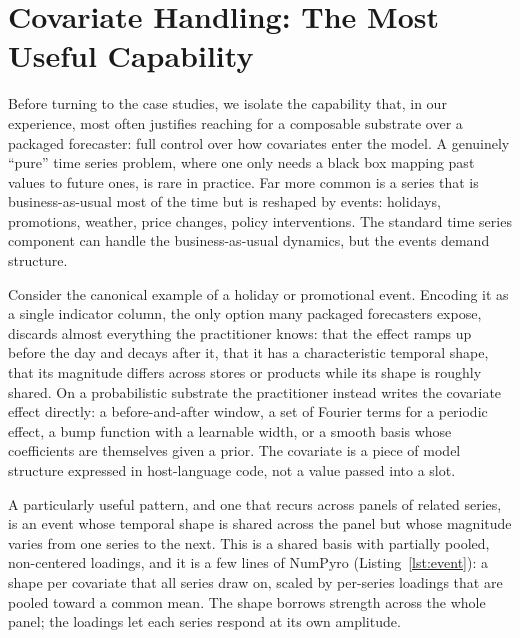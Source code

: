 \documentclass[11pt,3p,review,authoryear]{elsarticle}
\begin{document}
\section{Covariate Handling: The Most Useful Capability}
\label{sec:covariates}

Before turning to the case studies, we isolate the capability that, in our experience, most often justifies reaching for a composable substrate over a packaged forecaster: full control over how covariates enter the model. A genuinely ``pure'' time series problem, where one only needs a black box mapping past values to future ones, is rare in practice. Far more common is a series that is business-as-usual most of the time but is reshaped by events: holidays, promotions, weather, price changes, policy interventions. The standard time series component can handle the business-as-usual dynamics, but the events demand structure.

Consider the canonical example of a holiday or promotional event. Encoding it as a single indicator column, the only option many packaged forecasters expose, discards almost everything the practitioner knows: that the effect ramps up before the day and decays after it, that it has a characteristic temporal shape, that its magnitude differs across stores or products while its shape is roughly shared. On a probabilistic substrate the practitioner instead writes the covariate effect directly: a before-and-after window, a set of Fourier terms for a periodic effect, a bump function with a learnable width, or a smooth basis whose coefficients are themselves given a prior. The covariate is a piece of model structure expressed in host-language code, not a value passed into a slot.

A particularly useful pattern, and one that recurs across panels of related series, is an event whose temporal shape is shared across the panel but whose magnitude varies from one series to the next. This is a shared basis with partially pooled, non-centered loadings, and it is a few lines of NumPyro (Listing~\ref{lst:event}): a shape per covariate that all series draw on, scaled by per-series loadings that are pooled toward a common mean. The shape borrows strength across the whole panel; the loadings let each series respond at its own amplitude.
\end{document}
